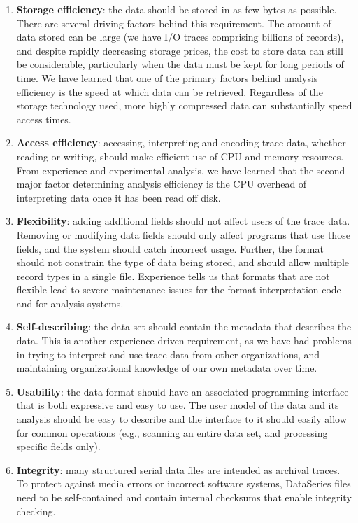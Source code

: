 \documentclass{acm_proc_article-sp}
\begin{document}
\begin{enumerate}

\item \textbf{Storage efficiency}: the data should be stored in as few
bytes as possible. There are several driving factors behind this
requirement. 
The amount of data stored can be large (we have
I/O traces comprising billions of records), and despite rapidly
decreasing storage prices, the cost to store data can still be
considerable, particularly when the data must be kept for long periods
of time. 
We have learned that one of the primary factors
behind analysis efficiency is the speed at which data can be
retrieved. Regardless of the storage technology used, more highly
compressed data can substantially speed access times.

\item \textbf{Access efficiency}: accessing, interpreting and encoding
trace data, whether reading or writing, should make efficient use of
CPU and memory resources. From experience and experimental analysis,
we have learned that the second major factor determining analysis
efficiency is the CPU overhead of interpreting data once it has been
read off disk.

\item \textbf{Flexibility}: adding additional fields should not affect
users of the trace data.  Removing or modifying data fields should
only affect programs that use those fields, and the system should
catch incorrect usage.  Further, the format should not constrain
the type of data being stored, and should allow multiple record types
in a single file. 
Experience 
tells us that formats that
are not flexible lead to severe maintenance issues for 
the format
interpretation code and for analysis systems.

\item \textbf{Self-describing}: the data set should contain the
metadata that describes the data. This is another experience-driven
requirement, as we have had problems in trying to interpret and use
trace data from other organizations, and maintaining organizational
knowledge of our own metadata over time.

\item \textbf{Usability}: the data format should have an
associated programming interface that is both expressive and easy to
use. 
The user model of the data and its analysis should
be easy to describe and the interface to it should easily allow for
common operations (e.g., scanning an entire data set, and processing
specific fields only).

\item \textbf{Integrity}: many structured serial data files are 
intended as archival traces. To protect against media
errors or incorrect software systems, DataSeries files need to be
self-contained and contain internal checksums that enable
integrity checking.

\end{enumerate}
\end{document}

